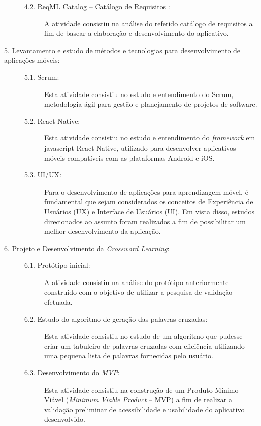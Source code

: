 \begin{description}
\begin{description}
    \item[4.2. ReqML Catalog -- Catálogo de Requisitos \citep{soad2017reqml}:]
    A atividade consistiu na análise do referido catálogo de requisitos a fim de basear a elaboração e desenvolvimento do aplicativo.
\end{description}


\item[5. Levantamento e estudo de métodos e tecnologias para desenvolvimento de aplicações móveis:]
\hfill

\begin{description}
\item[5.1. Scrum:] Esta atividade consistiu no estudo e entendimento do Scrum, metodologia ágil para gestão e planejamento de projetos de software. %

\item[5.2. React Native:] Esta atividade consistiu no estudo e entendimento do \textit{framework} em javascript React Native, utilizado para desenvolver aplicativos móveis compatíveis com as plataformas Android e iOS.

\item[5.3. UI/UX:] Para o desenvolvimento de aplicações para aprendizagem móvel, é fundamental que sejam considerados os conceitos de Experiência de Usuários (UX) e Interface de Usuários (UI). Em vista disso, estudos direcionados ao assunto foram realizados a fim de possibilitar um melhor desenvolvimento da aplicação.

\end{description}

\item[6. Projeto e Desenvolvimento da \textit{Crossword Learning}:]
\hfill

\begin{description}
    \item[6.1. Protótipo inicial:]
    A atividade consistiu na análise do protótipo anteriormente construído com o objetivo de utilizar a pesquisa de validação efetuada.
    
    \item[6.2. Estudo do algoritmo de geração das palavras cruzadas:]
    Esta atividade consistiu no estudo de um algoritmo que pudesse criar um tabuleiro de palavras cruzadas com eficiência utilizando uma pequena lista de palavras fornecidas pelo usuário.
    
    \item[6.3. Desenvolvimento do \textit{MVP}:] 
    Esta atividade consistiu na construção de um Produto Mínimo Viável (\textit{Minimum Viable Product} -- MVP) a fim de realizar a validação preliminar de acessibilidade e usabilidade do aplicativo desenvolvido.
\end{description}

\end{description}